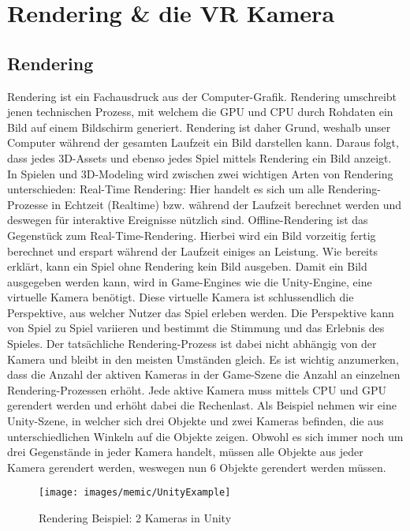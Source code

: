 \section{Rendering \& die VR Kamera}


\subsection{Rendering}

Rendering ist ein Fachausdruck aus der Computer-Grafik. Rendering umschreibt jenen technischen Prozess, mit welchem die GPU und CPU durch Rohdaten ein Bild auf einem Bildschirm generiert. Rendering ist daher Grund, weshalb unser Computer während der gesamten Laufzeit ein Bild darstellen kann. Daraus folgt, dass jedes 3D-Assets und ebenso jedes Spiel mittels Rendering ein Bild anzeigt. In Spielen und 3D-Modeling wird zwischen zwei wichtigen Arten von Rendering unterschieden:
Real-Time Rendering: Hier handelt es sich um alle Rendering-Prozesse in Echtzeit (Realtime) bzw. während der Laufzeit berechnet werden und deswegen für interaktive Ereignisse nützlich sind.\cite{_guide_to_Build_3D_Character}
Offline-Rendering ist das Gegenstück zum Real-Time-Rendering. Hierbei wird ein Bild vorzeitig fertig berechnet und erspart während der Laufzeit einiges an Leistung.\cite{_guide_to_Build_3D_Character}
Wie bereits erklärt, kann ein Spiel ohne Rendering kein Bild ausgeben. Damit ein Bild ausgegeben werden kann, wird in Game-Engines wie die Unity-Engine, eine virtuelle Kamera benötigt. Diese virtuelle Kamera ist schlussendlich die Perspektive, aus welcher Nutzer das Spiel erleben werden. Die Perspektive kann von Spiel zu Spiel variieren und bestimmt die Stimmung und das Erlebnis des Spieles. Der tatsächliche Rendering-Prozess ist dabei nicht abhängig von der Kamera und bleibt in den meisten Umständen gleich.
Es ist wichtig anzumerken, dass die Anzahl der aktiven Kameras in der Game-Szene die Anzahl an einzelnen Rendering-Prozessen erhöht. Jede aktive Kamera muss mittels CPU und GPU gerendert werden und erhöht dabei die Rechenlast.
Als Beispiel nehmen wir eine Unity-Szene, in welcher sich drei Objekte und zwei Kameras befinden, die aus unterschiedlichen Winkeln auf die Objekte zeigen. Obwohl es sich immer noch um drei Gegenstände in jeder Kamera handelt, müssen alle Objekte aus jeder Kamera gerendert werden, weswegen nun 6 Objekte gerendert werden müssen.

\begin{figure}[H]
	\centering
	\texttt{[image: images/memic/UnityExample]}
	\caption{Rendering Beispiel: 2 Kameras in Unity}
\end{figure}

